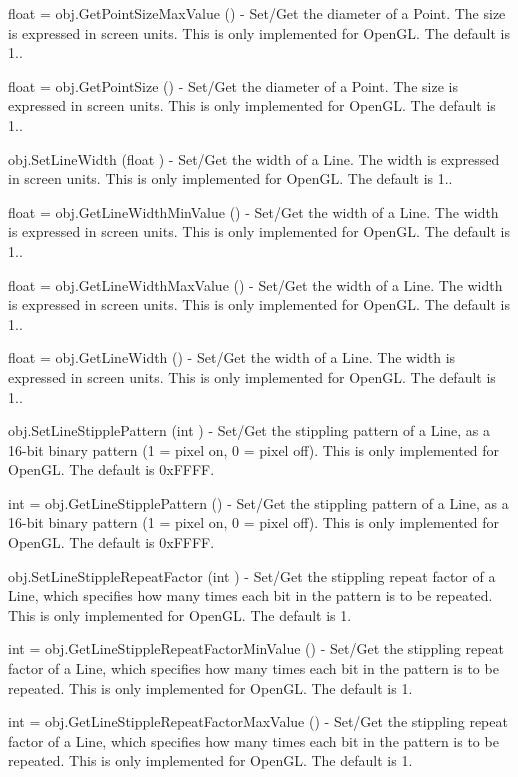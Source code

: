 \begin{DoxyItemize}
\item {\ttfamily float = obj.\-Get\-Point\-Size\-Max\-Value ()} -\/ Set/\-Get the diameter of a Point. The size is expressed in screen units. This is only implemented for Open\-G\-L. The default is 1..  
\item {\ttfamily float = obj.\-Get\-Point\-Size ()} -\/ Set/\-Get the diameter of a Point. The size is expressed in screen units. This is only implemented for Open\-G\-L. The default is 1..  
\item {\ttfamily obj.\-Set\-Line\-Width (float )} -\/ Set/\-Get the width of a Line. The width is expressed in screen units. This is only implemented for Open\-G\-L. The default is 1..  
\item {\ttfamily float = obj.\-Get\-Line\-Width\-Min\-Value ()} -\/ Set/\-Get the width of a Line. The width is expressed in screen units. This is only implemented for Open\-G\-L. The default is 1..  
\item {\ttfamily float = obj.\-Get\-Line\-Width\-Max\-Value ()} -\/ Set/\-Get the width of a Line. The width is expressed in screen units. This is only implemented for Open\-G\-L. The default is 1..  
\item {\ttfamily float = obj.\-Get\-Line\-Width ()} -\/ Set/\-Get the width of a Line. The width is expressed in screen units. This is only implemented for Open\-G\-L. The default is 1..  
\item {\ttfamily obj.\-Set\-Line\-Stipple\-Pattern (int )} -\/ Set/\-Get the stippling pattern of a Line, as a 16-\/bit binary pattern (1 = pixel on, 0 = pixel off). This is only implemented for Open\-G\-L. The default is 0x\-F\-F\-F\-F.  
\item {\ttfamily int = obj.\-Get\-Line\-Stipple\-Pattern ()} -\/ Set/\-Get the stippling pattern of a Line, as a 16-\/bit binary pattern (1 = pixel on, 0 = pixel off). This is only implemented for Open\-G\-L. The default is 0x\-F\-F\-F\-F.  
\item {\ttfamily obj.\-Set\-Line\-Stipple\-Repeat\-Factor (int )} -\/ Set/\-Get the stippling repeat factor of a Line, which specifies how many times each bit in the pattern is to be repeated. This is only implemented for Open\-G\-L. The default is 1.  
\item {\ttfamily int = obj.\-Get\-Line\-Stipple\-Repeat\-Factor\-Min\-Value ()} -\/ Set/\-Get the stippling repeat factor of a Line, which specifies how many times each bit in the pattern is to be repeated. This is only implemented for Open\-G\-L. The default is 1.  
\item {\ttfamily int = obj.\-Get\-Line\-Stipple\-Repeat\-Factor\-Max\-Value ()} -\/ Set/\-Get the stippling repeat factor of a Line, which specifies how many times each bit in the pattern is to be repeated. This is only implemented for Open\-G\-L. The default is 1.  

\end{DoxyItemize}
